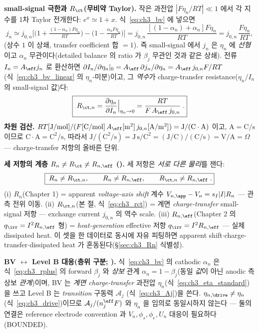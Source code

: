 \textbf{small-signal 극한과 $R_\ct$(무비약 Taylor).} 작은 과전압 $|F\eta_n/RT|\ll1$ 에서 각 지수를 1차 Taylor
전개한다: $e^{x}\simeq1+x$. 식~\eqref{eq:ch3_bv} 에 넣으면
\begin{equation}
j_n\simeq j_{0,n}\Big[\big(1+\tfrac{(1-\alpha_n)F\eta_n}{RT}\big)-\big(1-\tfrac{\alpha_n F\eta_n}{RT}\big)\Big]
=j_{0,n}\,\frac{[(1-\alpha_n)+\alpha_n]F\eta_n}{RT}=j_{0,n}\,\frac{F\eta_n}{RT},
\label{eq:ch3_bv_linear}
\end{equation}
(상수 $1$ 이 상쇄, transfer coefficient 합 $=1$). 즉 small-signal 에서 $j_n$ 은 $\eta_n$ 에 \emph{선형}이고
$\alpha_n$ 무관이다(detailed balance 의 ratio 가 $\beta_j$ 무관인 것과 같은 상쇄). 전류 $I_n=A_\eff j_n$ 로
환산하면 $\partial I_n/\partial\eta_n|_0=A_\eff\,\partial j_n/\partial\eta_n=A_\eff\,j_{0,n}F/RT$(식~\eqref{eq:ch3_bv_linear}
의 $\eta_n$-미분)이고, 그 \emph{역수}가 charge-transfer resistance($\eta_n/I_n$ 의 small-signal 값)다:
\begin{equation}
\boxed{\;R_{\ct,n}=\frac{\partial\eta_n}{\partial I_n}\Big|_{\eta_n\to0}=\frac{RT}{F\,A_\eff\,j_{0,n}}\;.}
\label{eq:ch3_rct}
\end{equation}
\textbf{차원 검산.} $RT[\mathrm{J/mol}]/(F[\mathrm{C/mol}]\,A_\eff[\mathrm{m^2}]\,j_{0,n}[\mathrm{A/m^2}])
=\mathrm{J}/(\mathrm{C}\cdot\mathrm{A})$ 이고, $\mathrm{A}=\mathrm{C/s}$ 이므로 $\mathrm{C\cdot A}=\mathrm{C^2/s}$,
따라서 $\mathrm J/(\mathrm{C^2/s})=\mathrm{J\,s/C^2}=(\mathrm{J/C})/(\mathrm{C/s})=\mathrm{V/A}=\Omega$
— charge-transfer 저항의 올바른 단위.
\begin{keybox}
\textbf{세 저항의 계층 $R_n\ne R_\ct\ne R_{n,\eff}$ ().} 세 저항은 \emph{서로 다른 물리}를 잰다:
\begin{equation}
\boxed{\;R_n\ne R_{\ct,n},\qquad R_n\ne R_{n,\eff},\qquad R_{\ct,n}\ne R_{n,\eff}\;.}
\label{eq:ch3_Rn_not_equal}
\end{equation}
(i) $R_n$(Chapter 1) = apparent \emph{voltage-axis shift} 계수 $V_{n,\app}-V_n=s_I|I|R_n$ — 관측 전위 이동.
(ii) $R_{\ct,n}$(본 절, 식~\eqref{eq:ch3_rct}) = 계면 \emph{charge-transfer} small-signal 저항 — exchange
current $j_{0,n}$ 의 역수 scale. (iii) $R_{n,\eff}$(Chapter 2 의 $q_\irr=I^2R_{n,\eff}$ 형) = \emph{heat-generation}
effective 저항 $q_\irr=I^2R_{n,\eff}$ — 실제 dissipated heat. 이 셋을 한 데이터로 동시에 자유 피팅하면 apparent
shift$\cdot$charge-transfer$\cdot$dissipated heat 가 혼동된다(\S\ref{sec:ch3_Rn} 식별성).
\end{keybox}
\begin{boundbox}
\textbf{BV $\leftrightarrow$ Level B 대응(층위 구분; ).} 식~\eqref{eq:ch3_bv} 의 cathodic $\alpha_n$ 은
식~\eqref{eq:ch3_rplus} 의 forward $\beta_j$ 와 \emph{상보} 관계 $\alpha_n=1-\beta_j$(동일 \emph{값}이 아닌 anodic 측
상보 \emph{관계})이며, BV 는 \emph{계면 charge-transfer}
과전압 $\eta_n$(식~\eqref{eq:ch3_eta_standard})을 쓰고 Level B 는 \emph{transition} 구동력 $\mathcal A_j$
(식~\eqref{eq:ch3_Aj})을 쓴다. $\eta_{n,\drive}\ne\eta_n$(식~\eqref{eq:ch3_drive})이므로 $\mathcal A_j/(n_j^\eff F)$
와 $\eta_n$ 을 임의로 동일시하지 않는다 — 둘의 연결은 reference electrode convention 과 $V_n,\phi_s,\phi_e,U_n$
대응이 필요하다(BOUNDED).
\end{boundbox}


